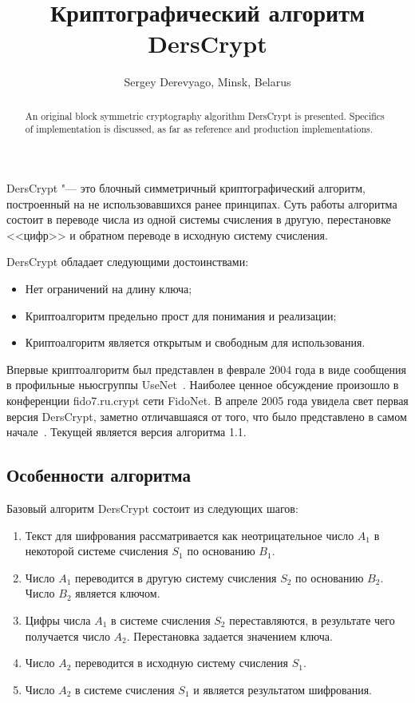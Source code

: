 \documentclass[10pt, a5paper]{article}
\begin{document}
\title{Криптографический алгоритм DersCrypt}
\author{Sergey Derevyago, Minsk, Belarus}
\maketitle
\begin{abstract}
An original block symmetric cryptography algorithm DersCrypt is presented. Specifics of implementation is discussed, as far as reference and production implementations.
\end{abstract}
DersCrypt "--- это блочный симметричный криптографический алгоритм, построенный на не использовавшихся ранее принципах. Суть работы алгоритма состоит в переводе числа из одной системы счисления в другую, перестановке <<цифр>> и обратном переводе в исходную систему счисления.

DersCrypt обладает следующими достоинствами:

\begin{itemize}
  \item Нет ограничений на длину ключа;
  \item Криптоалгоритм предельно прост для понимания и реализации;
  \item Криптоалгоритм является открытым и свободным для использования.
\end{itemize}

Впервые криптоалгоритм был представлен в феврале 2004 года в виде сообщения в профильные ньюсгруппы UseNet~\cite{Derevyago1}. Наиболее ценное обсуждение произошло в конференции fido7.ru.crypt сети FidoNet. В апреле 2005 года увидела свет первая версия DersCrypt, заметно отличавшаяся от того, что было представлено в самом начале~\cite{Derevyago2}. Текущей является версия алгоритма 1.1.

\subsection*{Особенности алгоритма}

Базовый алгоритм DersCrypt состоит из следующих шагов:

\begin{enumerate}
  \item Текст для шифрования рассматривается как неотрицательное число $A_{1}$ в некоторой системе счисления $S_{1}$ по основанию $B_{1}$.
  \item Число $A_{1}$ переводится в другую систему счисления $S_{2}$ по основанию $B_{2}$. Число $B_{2}$ является ключом.
  \item Цифры числа $A_{1}$ в системе счисления $S_{2}$ переставляются, в результате чего получается число $A_{2}$. Перестановка задается значением ключа.
  \item Число $A_{2}$ переводится в исходную систему счисления $S_{1}$.
  \item Число $A_{2}$ в системе счисления $S_{1}$ и является результатом шифрования.
\end{enumerate}
\end{document}
